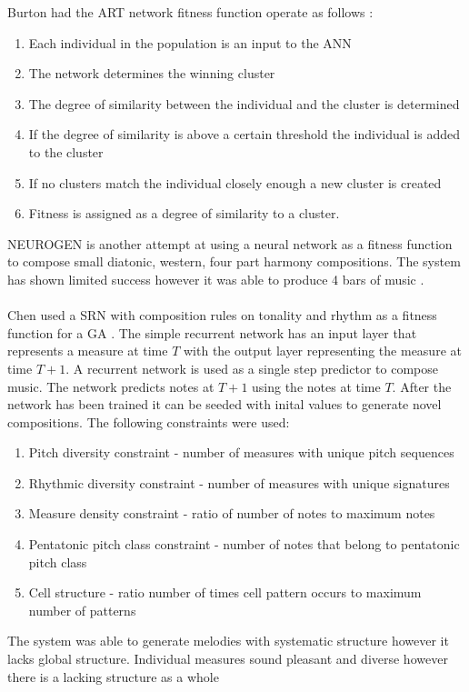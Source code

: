 Burton had the \ac{ART} network fitness function operate as follows \cite{Burton97geneticalgorithm}:
\begin{enumerate}
\item Each individual in the population is an input to the \ac{ANN}
\item The network determines the winning cluster
\item The degree of similarity between the individual and the cluster is determined
\item If the degree of similarity is above a certain threshold the individual is added to the cluster
\item If no clusters match the individual closely enough a new cluster is created
\item Fitness is assigned as a degree of similarity to a cluster. 
\end{enumerate}

NEUROGEN is another attempt at using a neural network as a fitness function to compose small diatonic, western, four part harmony compositions.
The system has shown limited success however it was able to produce 4 bars of music \cite{gibson1991neurogen}.
\\
\\
Chen used a \ac{SRN} with composition rules on tonality and rhythm as a fitness function for a \ac{GA} \cite{Chen2001}. The simple recurrent network has an input layer that represents a measure at time $T$ with the output layer representing the measure at time $T+1$.
A recurrent network is used as a single step predictor to compose music. The network predicts notes at $T+1$ using the notes at time $T$. After the network has been trained it can be seeded with inital values to generate novel compositions.
The following constraints were used:
\begin{enumerate}
\item Pitch diversity constraint - number of measures with unique pitch sequences
\item Rhythmic diversity constraint - number of measures with unique signatures
\item Measure density constraint - ratio of number of notes to maximum notes
\item Pentatonic pitch class constraint - number of notes that belong to pentatonic pitch class
\item Cell structure - ratio number of times cell pattern occurs to maximum number of patterns 
\end{enumerate}
The system was able to generate melodies with systematic structure however it lacks global structure. Individual measures sound pleasant and diverse however there is a lacking structure as a whole

